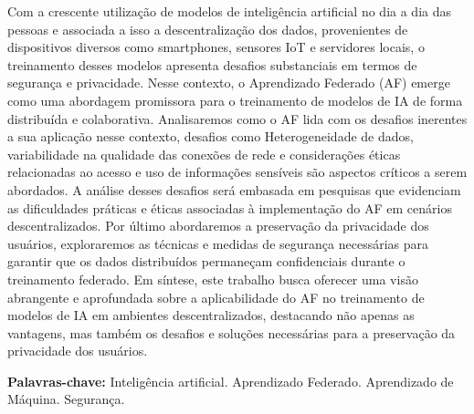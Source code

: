 \begin{resumo}
 Com a crescente utilização de modelos de inteligência artificial no dia a dia das pessoas e associada a isso a descentralização dos dados, provenientes de dispositivos diversos como smartphones, sensores IoT e servidores locais, o treinamento desses modelos apresenta desafios substanciais em termos de segurança e privacidade. Nesse contexto, o Aprendizado Federado (AF) emerge como uma abordagem promissora para o treinamento de modelos de IA de forma distribuída e colaborativa. Analisaremos como o AF lida com os desafios inerentes a sua aplicação nesse contexto, desafios como Heterogeneidade de dados, variabilidade na qualidade das conexões de rede e considerações éticas relacionadas ao acesso e uso de informações sensíveis são aspectos críticos a serem abordados. A análise desses desafios será embasada em pesquisas que evidenciam as dificuldades práticas e éticas associadas à implementação do AF em cenários descentralizados. Por último abordaremos a preservação da privacidade dos usuários, exploraremos as técnicas e medidas de segurança necessárias para garantir que os dados distribuídos permaneçam confidenciais durante o treinamento federado. Em síntese, este trabalho busca oferecer uma visão abrangente e aprofundada sobre a aplicabilidade do AF no treinamento de modelos de IA em ambientes descentralizados, destacando não apenas as vantagens, mas também os desafios e soluções necessárias para a preservação da privacidade dos usuários.

 \vspace{\onelineskip}
    
 \noindent
 \textbf{Palavras-chave:} Inteligência artificial. Aprendizado Federado. Aprendizado de Máquina. Segurança. 
\end{resumo}